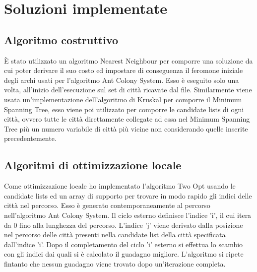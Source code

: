 \chapter*{Soluzioni implementate}
\label{cha_soluzioni}

\section*{Algoritmo costruttivo}
\label{sec_costruttivo}
È stato utilizzato un algoritmo Nearest Neighbour per comporre una soluzione da cui poter derivare
il suo costo ed impostare di conseguenza il feromone iniziale degli archi usati per l'algoritmo 
Ant Colony System.\newline
Esso è eseguito solo una volta, all'inizio dell'esecuzione sul set di città ricavate dal file.\newline
Similarmente viene usata un'implementazione dell'algoritmo di Kruskal per comporre il Minimum Spanning
Tree, esso viene poi utilizzato per comporre le candidate lists di ogni città, ovvero tutte le città direttamente
collegate ad essa nel Minimum Spanning Tree più un numero variabile di città più vicine non considerando quelle 
inserite precedentemente.
\noindent 

\section*{Algoritmi di ottimizzazione locale}
\label{sec_ottimizzazione}
Come ottimizzazione locale ho implementato l'algoritmo Two Opt usando le candidate lists ed un array di
supporto per trovare in modo rapido gli indici delle città nel percorso.\newline
Esso è generato contemporaneamente al percorso nell'algoritmo Ant Colony System.\newline
Il ciclo esterno definisce l'indice 'i', il cui itera da 0 fino alla lunghezza del percorso.\newline
L'indice 'j' viene derivato dalla posizione nel percorso delle città presenti nella candidate list della città 
specificata dall'indice 'i'.\newline
Dopo il completamento del ciclo 'i' esterno si effettua lo scambio con gli indici dai quali si è calcolato
il guadagno migliore. \newline
L'algoritmo si ripete fintanto che nessun guadagno viene trovato dopo un'iterazione completa.

